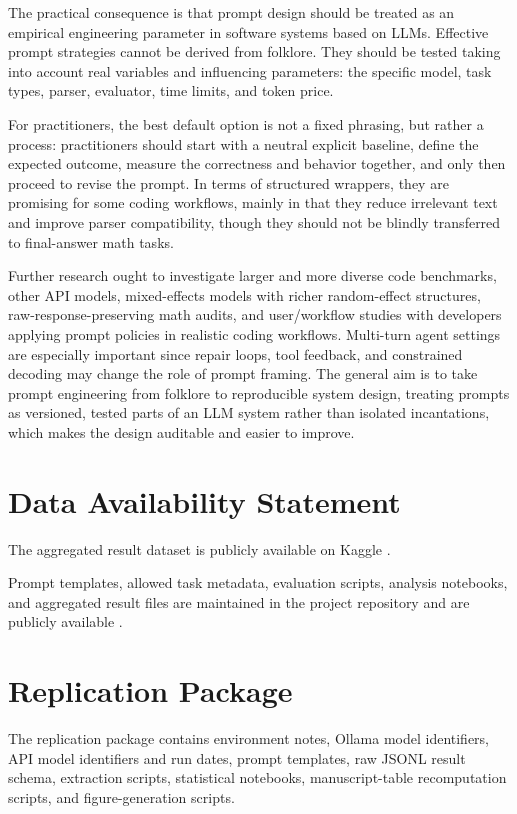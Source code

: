 \documentclass{llncs}
\begin{document}
The practical consequence is that prompt design should be treated as an empirical engineering parameter in software systems based on LLMs. Effective prompt strategies cannot be derived from folklore. They should be tested taking into account real variables and influencing parameters: the specific model, task types, parser, evaluator, time limits, and token price.

For practitioners, the best default option is not a fixed phrasing, but rather a process: practitioners should start with a neutral explicit baseline, define the expected outcome, measure the correctness and behavior together, and only then proceed to revise the prompt. In terms of structured wrappers, they are promising for some coding workflows, mainly in that they reduce irrelevant text and improve parser compatibility, though they should not be blindly transferred to final-answer math tasks.

Further research ought to investigate larger and more diverse code benchmarks, other API models, mixed-effects models with richer random-effect structures, raw-response-preserving math audits, and user/workflow studies with developers applying prompt policies in realistic coding workflows. Multi-turn agent settings are especially important since repair loops, tool feedback, and constrained decoding may change the role of prompt framing. The general aim is to take prompt engineering from folklore to reproducible system design, treating prompts as versioned, tested parts of an LLM system rather than isolated incantations, which makes the design auditable and easier to improve.

\section{Data Availability Statement}\label{data-availability-statement}

The aggregated result dataset is publicly available on Kaggle \cite{promptframingkaggle2026}.

Prompt templates, allowed task metadata, evaluation scripts, analysis notebooks, and aggregated result files are maintained in the project repository and are publicly available \cite{promptframingrepo2026}.

\section{Replication Package}\label{replication-package}

The replication package contains environment notes, Ollama model
identifiers, API model identifiers and run dates, prompt templates, raw
JSONL result schema, extraction scripts, statistical notebooks,
manuscript-table recomputation scripts, and figure-generation scripts.
\end{document}
